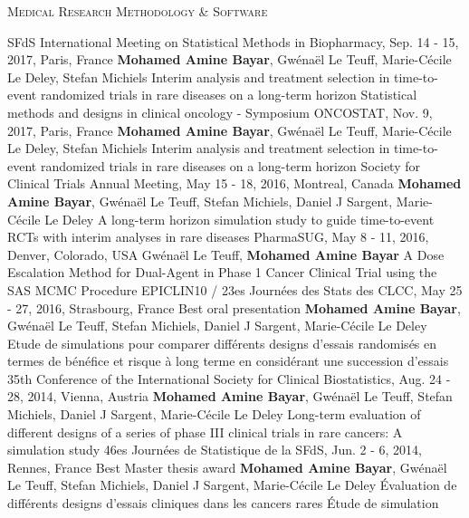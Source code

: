 \vspace*{-1em}
\vspace*{.5em}
\textsc{{\color{accentcolor} Medical Research Methodology \& Software}}
\begin{projects}
\paper
{SFdS International Meeting on Statistical Methods in Biopharmacy, Sep. 14 - 15, 2017, Paris, France}
{}
{\textbf{Mohamed Amine Bayar}, Gw\'{e}na\"{e}l Le Teuff, Marie-C\'{e}cile Le Deley, Stefan Michiels}
{Interim analysis and treatment selection in time-to-event randomized trials in rare diseases on a long-term horizon}
\paper
{Statistical methods and designs in clinical oncology - Symposium ONCOSTAT, Nov. 9, 2017, Paris, France}
{}
{\textbf{Mohamed Amine Bayar}, Gw\'{e}na\"{e}l Le Teuff, Marie-C\'{e}cile Le Deley, Stefan Michiels}
{Interim analysis and treatment selection in time-to-event randomized trials in rare diseases on a long-term horizon}
\paper
{Society for Clinical Trials Annual Meeting, May 15 - 18, 2016, Montreal, Canada}
{}
{\textbf{Mohamed Amine Bayar}, Gw\'{e}na\"{e}l Le Teuff, Stefan Michiels, Daniel J Sargent, Marie-C\'{e}cile Le Deley}
{A long-term horizon simulation study to guide time-to-event RCTs with interim analyses in rare diseases}
\paper
{PharmaSUG, May 8 - 11, 2016, Denver, Colorado, USA}
{}
{Gw\'{e}na\"{e}l Le Teuff, \textbf{Mohamed Amine Bayar}}
{A Dose Escalation Method for Dual-Agent in Phase 1 Cancer Clinical Trial using the SAS MCMC Procedure}
\paper
{EPICLIN10 / 23es Journées des Stats des CLCC, May 25 - 27, 2016, Strasbourg, France}
{\color{gold}\faTrophy \hspace*{0.05em} Best oral presentation}
{\textbf{Mohamed Amine Bayar}, Gw\'{e}na\"{e}l Le Teuff, Stefan Michiels, Daniel J Sargent, Marie-C\'{e}cile Le Deley}
{Etude de simulations pour comparer différents designs d’essais randomisés en termes de bénéfice et risque à long terme en considérant une succession d’essais}
\paper
{35th Conference of the International Society for Clinical Biostatistics, Aug. 24 - 28, 2014, Vienna, Austria}
{}
{\textbf{Mohamed Amine Bayar}, Gw\'{e}na\"{e}l Le Teuff, Stefan Michiels, Daniel J Sargent, Marie-C\'{e}cile Le Deley}
{Long-term evaluation of different designs of a series of phase III clinical trials in rare cancers: A simulation study}
\paper
{46es Journées de Statistique de la SFdS, Jun. 2 - 6, 2014, Rennes, France}
{\color{gold}\faTrophy \hspace*{0.05em} Best Master thesis award}
{\textbf{Mohamed Amine Bayar}, Gw\'{e}na\"{e}l Le Teuff, Stefan Michiels, Daniel J Sargent, Marie-C\'{e}cile Le Deley}
{Évaluation de différents designs d’essais cliniques dans les cancers rares Étude de simulation}
\end{projects}
